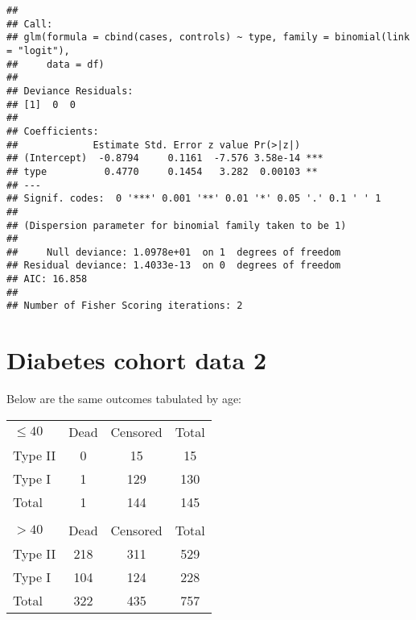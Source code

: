 \documentclass[landscape,twocolumn,letterpaper,9pt,reqno]{article}\usepackage[]{graphicx}\usepackage[]{color}
\newenvironment{knitrout}{}{} %
\begin{document}
\begin{knitrout}
\color{fgcolor}
\begin{verbatim}
## 
## Call:
## glm(formula = cbind(cases, controls) ~ type, family = binomial(link = "logit"), 
##     data = df)
## 
## Deviance Residuals: 
## [1]  0  0
## 
## Coefficients:
##             Estimate Std. Error z value Pr(>|z|)    
## (Intercept)  -0.8794     0.1161  -7.576 3.58e-14 ***
## type          0.4770     0.1454   3.282  0.00103 ** 
## ---
## Signif. codes:  0 '***' 0.001 '**' 0.01 '*' 0.05 '.' 0.1 ' ' 1
## 
## (Dispersion parameter for binomial family taken to be 1)
## 
##     Null deviance: 1.0978e+01  on 1  degrees of freedom
## Residual deviance: 1.4033e-13  on 0  degrees of freedom
## AIC: 16.858
## 
## Number of Fisher Scoring iterations: 2
\end{verbatim}

\end{knitrout}



\clearpage

\section{Diabetes cohort data 2}

Below are the same outcomes tabulated by age:

\begin{table}[h]
	\centering
	\begin{tabular}{lcc|c}
		$\leq 40$ & Dead &  Censored & Total\\
		Type II & 0 & 15 & 15 \\
		Type I & 1 & 129 & 130 \\
		\hline
		Total & 1 & 144 & 145 \\
		& & & \\
		$> 40$ & Dead &  Censored & Total\\
		Type II & 218 & 311 & 529 \\
		Type I & 104 & 124 & 228 \\
				\hline
		Total & 322 & 435 & 757 \\ 
	\end{tabular}
\end{table}
\end{document}
